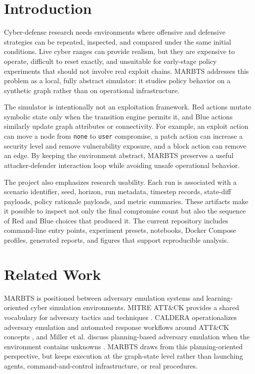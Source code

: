 \documentclass[conference]{IEEEtran}
\begin{document}
\section{Introduction}
Cyber-defense research needs environments where offensive and defensive strategies can be repeated, inspected, and compared under the same initial conditions. Live cyber ranges can provide realism, but they are expensive to operate, difficult to reset exactly, and unsuitable for early-stage policy experiments that should not involve real exploit chains. MARBTS addresses this problem as a local, fully abstract simulator: it studies policy behavior on a synthetic graph rather than on operational infrastructure.

The simulator is intentionally not an exploitation framework. Red actions mutate symbolic state only when the transition engine permits it, and Blue actions similarly update graph attributes or connectivity. For example, an exploit action can move a node from \texttt{none} to \texttt{user} compromise, a patch action can increase a security level and remove vulnerability exposure, and a block action can remove an edge. By keeping the environment abstract, MARBTS preserves a useful attacker-defender interaction loop while avoiding unsafe operational behavior.

The project also emphasizes research usability. Each run is associated with a scenario identifier, seed, horizon, run metadata, timestep records, state-diff payloads, policy rationale payloads, and metric summaries. These artifacts make it possible to inspect not only the final compromise count but also the sequence of Red and Blue choices that produced it. The current repository includes command-line entry points, experiment presets, notebooks, Docker Compose profiles, generated reports, and figures that support reproducible analysis.

\section{Related Work}
MARBTS is positioned between adversary emulation systems and learning-oriented cyber simulation environments. MITRE ATT\&CK provides a shared vocabulary for adversary tactics and techniques \cite{attack}. CALDERA operationalizes adversary emulation and automated response workflows around ATT\&CK concepts \cite{caldera}, and Miller et al. discuss planning-based adversary emulation when the environment contains unknowns \cite{miller}. MARBTS draws from this planning-oriented perspective, but keeps execution at the graph-state level rather than launching agents, command-and-control infrastructure, or real procedures.
\end{document}
